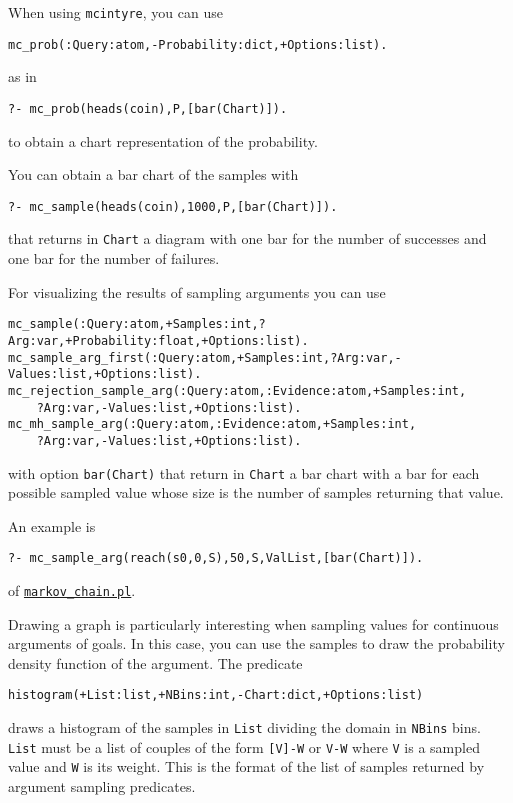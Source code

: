 When using \verb|mcintyre|, you can use
\begin{verbatim}
mc_prob(:Query:atom,-Probability:dict,+Options:list).
\end{verbatim}
as in
\begin{verbatim}
?- mc_prob(heads(coin),P,[bar(Chart)]).
\end{verbatim}
to obtain a chart representation of the probability.

You can obtain a bar chart of the samples with
\begin{verbatim}
?- mc_sample(heads(coin),1000,P,[bar(Chart)]).
\end{verbatim}
that returns in \verb|Chart| a diagram with one bar for the number of successes and
one bar for the number of failures.

For visualizing the results of sampling arguments you can use
\begin{verbatim}
mc_sample(:Query:atom,+Samples:int,?Arg:var,+Probability:float,+Options:list).
mc_sample_arg_first(:Query:atom,+Samples:int,?Arg:var,-Values:list,+Options:list).
mc_rejection_sample_arg(:Query:atom,:Evidence:atom,+Samples:int,
	?Arg:var,-Values:list,+Options:list).
mc_mh_sample_arg(:Query:atom,:Evidence:atom,+Samples:int,
	?Arg:var,-Values:list,+Options:list).
\end{verbatim}
with option \verb|bar(Chart)| that return in \verb|Chart| a bar chart with a bar for each possible sampled value whose size is the number of samples
returning that value.

An example is
\begin{verbatim}
?- mc_sample_arg(reach(s0,0,S),50,S,ValList,[bar(Chart)]).
\end{verbatim}
of \href{http://cplint.ml.unife.it/example/inference/markov_chain.pl}{\texttt{markov\_chain.pl}}.

Drawing a graph is particularly interesting when
sampling values for continuous arguments of goals.
In this case, you can use the samples to draw the
probability density function of the argument.
The predicate
\begin{verbatim}
histogram(+List:list,+NBins:int,-Chart:dict,+Options:list)
\end{verbatim}
draws a histogram of the samples in \verb|List| dividing the domain in
 \verb|NBins| bins.
\verb|List| must be a list of couples of the form \verb|[V]-W| or  \verb|V-W|
where \verb|V| is a sampled value and \verb|W| is its weight. This is the format of the list of samples returned by argument sampling predicates.

